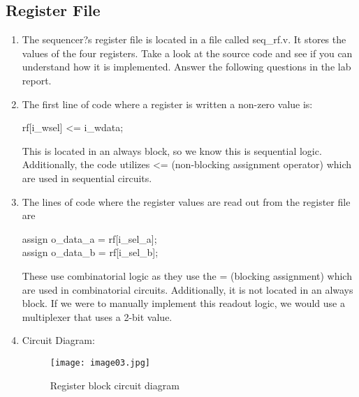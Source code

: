 \documentclass{article}
\begin{document}
\subsection*{Register File}
\begin{enumerate}[label=\arabic*), ref=\arabic*]
	\item The sequencer?s register file is located in a file called seq\_rf.v. It stores the values of the four registers. Take a look at the source code and see if you can understand how it is implemented. Answer the following questions in the lab report.
	\item The first line of code where a register is written a non-zero value is: 
		\begin{center}
		rf[i\_wsel] <= i\_wdata; 
		\end{center}
This is located in an always block, so we know this is sequential logic.  Additionally, 
the code utilizes <= (non-blocking assignment operator) which are used in sequential circuits. 
	\item The lines of code where the register values are read out from the register file are 
\begin{center}
assign o\_data\_a = rf[i\_sel\_a]; \\
assign o\_data\_b = rf[i\_sel\_b];
\end{center}
These use combinatorial logic as they use the = (blocking assignment) which are used in combinatorial circuits.  Additionally, it is not located in an always block.  If we were to manually implement this readout logic, we would use a multiplexer that uses a 2-bit value. 

	\item Circuit Diagram:
	\begin{figure}[H]
	\begin{center}
	\texttt{[image: image03.jpg]} 
	\caption{Register block circuit diagram}
	\end{center}
	\end{figure}
	

\end{enumerate}
\end{document}
